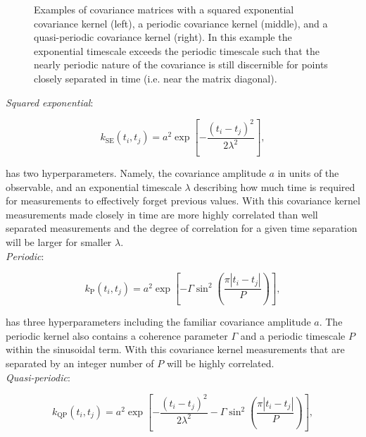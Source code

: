 \begin{figure}
  \centering
  \caption[Example of covariance matrices.]
          {Examples of covariance matrices with a squared exponential covariance kernel (left),
            a periodic covariance kernel (middle), and a quasi-periodic covariance kernel (right).
            In this example the exponential timescale exceeds the periodic timescale such that the
            nearly periodic nature of the covariance is still discernible for points closely separated
          in time (i.e. near the matrix diagonal).}
          \label{fig:matrices}
\end{figure}

\emph{Squared exponential}: 

\begin{equation}
  k_{\text{SE}}(t_i,t_j) = a^2 \exp{\left[ -\frac{(t_i-t_j)^2}{2\lambda^2} \right]},
\end{equation}

\noindent has two hyperparameters. Namely, the covariance amplitude $a$ in units of the observable,
and an exponential timescale $\lambda$ describing how much time is required for measurements to
effectively forget previous values. With this covariance kernel measurements made closely in time
are more highly correlated than well separated measurements and the degree of correlation for a
given time separation will be larger for smaller $\lambda$. \\

\emph{Periodic}:

\begin{equation}
  k_{\text{P}}(t_i,t_j) = a^2 \exp{\left[ -\Gamma \sin^2{\left( \frac{\pi |t_i-t_j|}{P} \right)} \right]},
\end{equation}

\noindent has three hyperparameters including the familiar covariance amplitude $a$. The periodic kernel
also contains a coherence parameter $\Gamma$ and a periodic timescale $P$ within the sinusoidal term.
With this covariance kernel measurements that are separated by an integer number of $P$ will be highly
correlated. \\

\emph{Quasi-periodic}:

\begin{equation}
  k_{\text{QP}}(t_i,t_j) = a^2 \exp{\left[ -\frac{(t_i-t_j)^2}{2\lambda^2} -\Gamma
      \sin^2{\left( \frac{\pi |t_i-t_j|}{P} \right)} \right]},
\end{equation}

